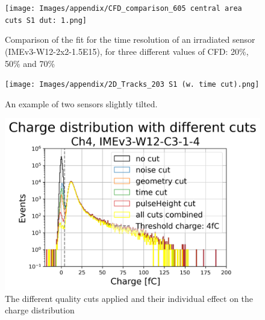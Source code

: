 \begin{figure}[h!tbp]
    \centering
    \texttt{[image: Images/appendix/CFD\_comparison\_605 central area cuts S1 dut: 1.png]}
    \caption{Comparison of the fit for the time resolution of an irradiated sensor (IMEv3-W12-2x2-1.5E15), for three different values of CFD: 20\%, 50\% and 70\%}
    \label{fig:CFD_comparison_irradiated}
\end{figure}


\begin{figure}[h!tbp]
    \centering
    \texttt{[image: Images/appendix/2D\_Tracks\_203 S1 (w. time cut).png]}
    \caption{An example of two sensors slightly tilted.}
    \label{fig:tilted_sensors}
\end{figure}


\begin{figure}[h!tbp]
    \centering
    \includegraphics[width=0.7\linewidth]{Images/appendix/Charge_distribution_different_cuts_batch_401_S1_DUTs_3.png}
    \caption{The different quality cuts applied and their individual effect on the charge distribution}
    \label{fig:charge_plot_all_cuts}
\end{figure}



